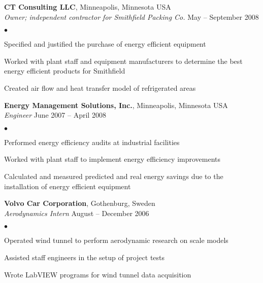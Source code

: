 \documentclass[margin,line,10pt]{res}
\newenvironment{list2}{
  \begin{list}{$\bullet$}{%
      \setlength{\itemsep}{0in}
      \setlength{\parsep}{0in} \setlength{\parskip}{0in}
      \setlength{\topsep}{0in} \setlength{\partopsep}{0in} 
      \setlength{\leftmargin}{0.2in}}}{\end{list}}
\begin{document}
\begin{resume}
\vspace*{-.1in}

{\bf CT Consulting LLC}, Minneapolis, Minnesota USA\\
\vspace{-.3cm}
{\em Owner; independent contractor for Smithfield Packing Co.} \hfill May -- September 2008\\
\begin{list2}
\item Specified and justified the purchase of energy efficient equipment
\item Worked with plant staff and equipment manufacturers to determine the best energy efficient  products for Smithfield
\item Created air flow and heat transfer model of refrigerated areas
\end{list2}

\vspace*{-.1in}

{\bf Energy Management Solutions, Inc.}, Minneapolis, Minnesota USA\\
\vspace{-.3cm}
{\em Engineer} \hfill June 2007 -- April 2008\\
\begin{list2}
\item Performed energy efficiency audits at industrial facilities
\item Worked with plant staff to implement energy efficiency improvements
\item Calculated and measured predicted and real energy savings due to the installation of energy efficient equipment
\end{list2}

\vspace*{-.1in}

{\bf Volvo Car Corporation}, Gothenburg, Sweden\\
\vspace{-.3cm}
{\em Aerodynamics Intern} \hfill August -- December 2006\\
\begin{list2}
\item Operated wind tunnel to perform aerodynamic research on scale models
\item Assisted staff engineers in the setup of project tests
\item Wrote LabVIEW programs for wind tunnel data acquisition
\end{list2}

\vspace*{-.1in}


\end{resume}
\end{document}
